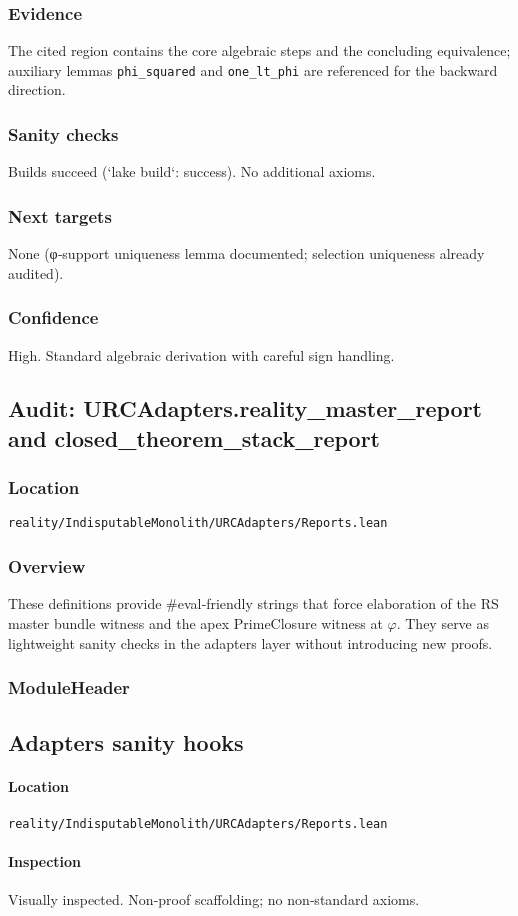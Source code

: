 \documentclass{article}
\newcommand{\FileRef}[1]{\texttt{#1}}
\newcommand{\ModuleHeader}[3]{%
  \subsection{#1}
  \paragraph{Location} \FileRef{#2}\\
  \paragraph{Inspection} #3
}
\begin{document}
\subsubsection{Evidence}
The cited region contains the core algebraic steps and the concluding equivalence; auxiliary lemmas \texttt{phi\_squared} and \texttt{one\_lt\_phi} are referenced for the backward direction.

\subsubsection{Sanity checks}
Builds succeed (`lake build`: success). No additional axioms.

\subsubsection{Next targets}
None (φ‑support uniqueness lemma documented; selection uniqueness already audited).

\subsubsection{Confidence}
High. Standard algebraic derivation with careful sign handling.

\subsection{Audit: URCAdapters.reality\_master\_report and closed\_theorem\_stack\_report}
\subsubsection{Location}
\FileRef{reality/IndisputableMonolith/URCAdapters/Reports.lean}

\subsubsection{Overview}
These definitions provide #eval‑friendly strings that force elaboration of the RS master bundle witness and the apex PrimeClosure witness at \(\varphi\). They serve as lightweight sanity checks in the adapters layer without introducing new proofs.

\subsubsection{ModuleHeader}
\ModuleHeader{Adapters sanity hooks}{reality/IndisputableMonolith/URCAdapters/Reports.lean}{Visually inspected. Non‑proof scaffolding; no non‑standard axioms.}
\end{document}

